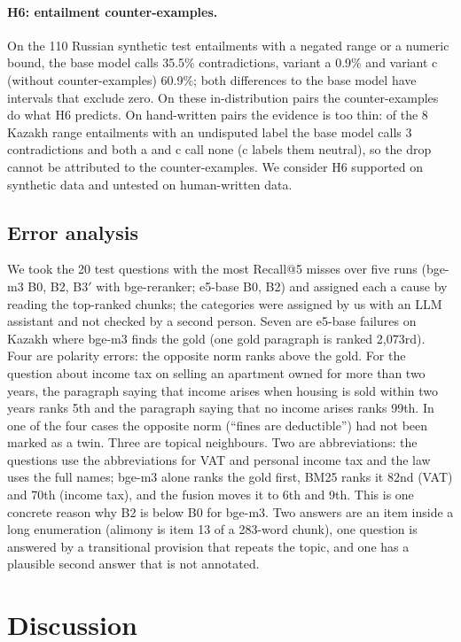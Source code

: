 \documentclass[11pt]{article}
\begin{document}
\paragraph{H6: entailment counter-examples.} On the 110 Russian synthetic test entailments with a negated range
or a numeric bound, the base model calls 35.5\% contradictions, variant a 0.9\% and variant c (without
counter-examples) 60.9\%; both differences to the base model have intervals that exclude zero. On these
in-distribution pairs the counter-examples do what H6 predicts. On hand-written pairs the evidence is too thin:
of the 8 Kazakh range entailments with an undisputed label the base model calls 3 contradictions and both a and
c call none (c labels them neutral), so the drop cannot be attributed to the counter-examples. We consider H6
supported on synthetic data and untested on human-written data.

\subsection{Error analysis}
We took the 20 test questions with the most Recall@5 misses over five runs (bge-m3 B0, B2, B3$'$ with
bge-reranker; e5-base B0, B2) and assigned each a cause by reading the top-ranked chunks; the categories were
assigned by us with an LLM assistant and not checked by a second person. Seven are e5-base
failures on Kazakh where bge-m3 finds the gold (one gold paragraph is ranked 2,073rd). Four are polarity
errors: the opposite norm ranks above the gold. For the question about income tax on selling an apartment owned
for more than two years, the paragraph saying that income arises when housing is sold within two years ranks
5th and the paragraph saying that no income arises ranks 99th. In one of the four cases the opposite norm
(``fines are deductible'') had not been marked as a twin. Three are topical neighbours. Two are abbreviations:
the questions use the abbreviations for VAT and personal income tax and the law uses the full names; bge-m3
alone ranks the gold first, BM25 ranks it 82nd (VAT) and 70th (income tax), and the fusion moves it to 6th
and 9th. This is one
concrete reason why B2 is below B0 for bge-m3. Two answers are an item inside a long enumeration (alimony is
item 13 of a 283-word chunk), one question is answered by a transitional provision that repeats the topic, and
one has a plausible second answer that is not annotated.

\section{Discussion}
\end{document}
